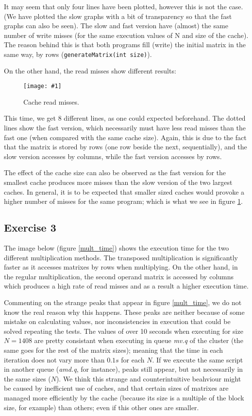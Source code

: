 \documentclass{article}
\newcommand{\myFigure}[4]{%
    \begin{figure}[!ht]
        \texttt{[image: \#1]}
        \centering
        \caption{#2}
        \label{#3}
    \end{figure}
}
\begin{document}
It may seem that only four lines have been plotted, however this is not the case. (We have plotted the slow graphs with a bit of transparency so that the fast graphs can also be seen). The slow and fast version have (almost) the same number of write misses (for the same execution values of N and size of the cache). The reason behind this is that both programs fill (write) the initial matrix in the same way, by rows (\texttt{generateMatrix(int size)}).

On the other hand, the read misses show different results:

\myFigure{../material_P3/out2/mv_att1/cache_lectura.png}{Cache read misses.}{cache_lectura}{0.55}

This time, we get 8 different lines, as one could expected beforehand. The dotted lines show the fast version, which necessarily must have less read misses than the fast one (when compared with the same cache size). Again, this is due to the fact that the matrix is stored by rows (one row beside the next, sequentially), and the slow version accesses by columns, while the fast version accesses by rows.

The effect of the cache size can also be observed as the fast version for the smallest cache produces more misses than the slow version of the two largest caches. In general, it is to be expected that smaller sized caches would provoke a higher number of misses for the same program; which is what we see in figure \ref{cache_lectura}.



\subsection*{Exercise 3}

The image below (figure \ref{mult_time}) shows the execution time for the two different multiplication methods. The transposed multiplication is significantly faster as it accesses matrixes by rows when multiplying. On the other hand, in the regular multiplication, the second operand matrix is accessed by columns which produces a high rate of read misses and as a result a higher execution time.

Commenting on the strange peaks that appear in figure \ref{mult_time}, we do not know the real reason why this happens. These peaks are neither because of some mistake on calculating values, nor inconsistencies in execution that could be solved repeating the tests. The values of over 10 seconds when executing for size $N=1408$ are pretty consistant when executing in queue \emph{mv.q} of the cluster (the same goes for the rest of the matrix sizes); meaning that the time in each iteration does not vary more than $0.1s$ for each $N$. If we execute the same script in another queue (\emph{amd.q}, for instance), peaks still appear, but not necessarily in the same sizes ($N$). We think this strange and counterintuitive beahviour might be caused by inefficient use of caches, and that certain sizes of matrixes are managed more efficiently by the cache (because its size is a multiple of the block size, for example) than others; even if this other ones are smaller.
\end{document}
